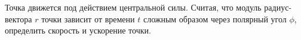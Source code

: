 Точка движется под действием центральной силы. Считая, что модуль радиус-вектора $r$ точки зависит от времени $t$ сложным
образом через полярный угол $\phi$, определить скорость и ускорение точки.
